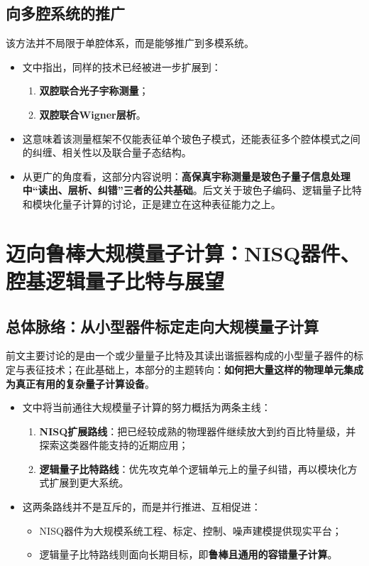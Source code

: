 \documentclass[12pt,a4paper,oneside]{ctexbook}
\begin{document}
\subsection*{向多腔系统的推广}

该方法并不局限于单腔体系，而是能够推广到多模系统。

\begin{itemize}
    \item 文中指出，同样的技术已经被进一步扩展到：
    \begin{enumerate}
        \item \textbf{双腔联合光子宇称测量}；
        \item \textbf{双腔联合Wigner层析}。
    \end{enumerate}
    
    \item 这意味着该测量框架不仅能表征单个玻色子模式，还能表征多个腔体模式之间的纠缠、相关性以及联合量子态结构。
    
    \item 从更广的角度看，这部分内容说明：\textbf{高保真宇称测量是玻色子量子信息处理中“读出、层析、纠错”三者的公共基础}。后文关于玻色子编码、逻辑量子比特和模块化量子计算的讨论，正是建立在这种表征能力之上。
\end{itemize}

\section{迈向鲁棒大规模量子计算：NISQ器件、腔基逻辑量子比特与展望}

\subsection{总体脉络：从小型器件标定走向大规模量子计算}

前文主要讨论的是由一个或少量量子比特及其读出谐振器构成的小型量子器件的标定与表征技术；在此基础上，本部分的主题转向：\textbf{如何把大量这样的物理单元集成为真正有用的复杂量子计算设备}。

\begin{itemize}
    \item 文中将当前通往大规模量子计算的努力概括为两条主线：
    \begin{enumerate}
        \item \textbf{NISQ扩展路线}：把已经较成熟的物理器件继续放大到约百比特量级，并探索这类器件能支持的近期应用；
        \item \textbf{逻辑量子比特路线}：优先攻克单个逻辑单元上的量子纠错，再以模块化方式扩展到更大系统。
    \end{enumerate}
    
    \item 这两条路线并不是互斥的，而是并行推进、互相促进：
    \begin{itemize}
        \item NISQ器件为大规模系统工程、标定、控制、噪声建模提供现实平台；
        \item 逻辑量子比特路线则面向长期目标，即\textbf{鲁棒且通用的容错量子计算}。
    \end{itemize}
\end{itemize}
\end{document}

